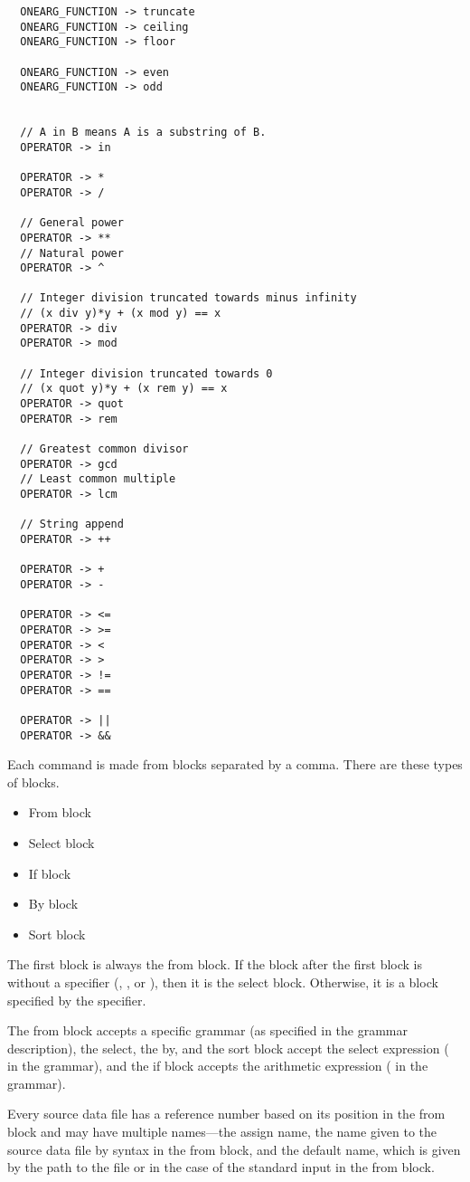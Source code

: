 \begin{verbatim}
  ONEARG_FUNCTION -> truncate
  ONEARG_FUNCTION -> ceiling
  ONEARG_FUNCTION -> floor
  
  ONEARG_FUNCTION -> even
  ONEARG_FUNCTION -> odd

  
  // A in B means A is a substring of B.
  OPERATOR -> in
  
  OPERATOR -> *
  OPERATOR -> /

  // General power
  OPERATOR -> **    
  // Natural power
  OPERATOR -> ^     
  
  // Integer division truncated towards minus infinity
  // (x div y)*y + (x mod y) == x
  OPERATOR -> div
  OPERATOR -> mod
  
  // Integer division truncated towards 0
  // (x quot y)*y + (x rem y) == x  
  OPERATOR -> quot
  OPERATOR -> rem

  // Greatest common divisor
  OPERATOR -> gcd
  // Least common multiple
  OPERATOR -> lcm
  
  // String append
  OPERATOR -> ++    
  
  OPERATOR -> +
  OPERATOR -> -
  
  OPERATOR -> <=
  OPERATOR -> >=
  OPERATOR -> <
  OPERATOR -> >
  OPERATOR -> !=
  OPERATOR -> ==
  
  OPERATOR -> ||
  OPERATOR -> &&
\end{verbatim}

Each command is made from blocks separated by a comma. There are these types of blocks.
\begin{itemize}
    \item From block
    \item Select block
    \item If block
    \item By block
    \item Sort block
\end{itemize}

The first block is always the from block. If the block after the first block is without a specifier (, , or ), then it is the select block. Otherwise, it is a block specified by the specifier.

The from block accepts a specific grammar (as specified in the grammar description), the select, the by, and the sort block accept the select expression ( in the grammar), 
and the if block accepts the arithmetic expression ( in the grammar).

Every source data file has a reference number based on its position in the from block and may have multiple names---the assign name, the name given to the source data file by  syntax in the from block, and  
the default name, which is given by the path to the file or \icode{-} in the case of the standard input in the from block.

